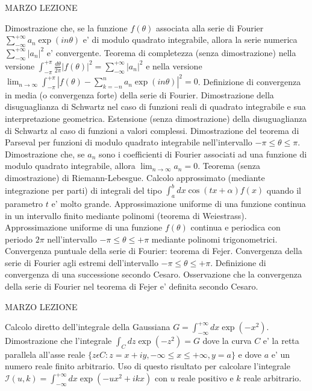 \documentclass[,12pt]{article}
\begin{document}
\vskip 20pt
 MARZO
\hskip 20pt
LEZIONE

\noindent
Dimostrazione che, se la funzione $f(\theta)$ associata alla serie di
Fourier \linebreak $\sum_{-\infty}^{+\infty}a_n\exp(in\theta)$ e' di
modulo quadrato integrabile, allora la serie numerica
$\sum_{-\infty}^{+\infty}|a_n|^2$ e' convergente. Teorema di
completezza (senza dimostrazione) nella versione
$\int_{-\pi}^{+\pi}
\frac{d\theta}{2\pi}|f(\theta)|^2=
\sum_{-\infty}^{+\infty}|a_n|^2$ e nella versione
$\lim_{n\to\infty}\int_{-\pi}^{+\pi}|f(\theta)-
\sum_{k=-n}^{n}a_n\exp(in\theta)|^2=0$. Definizione di convergenza in
media (o convergenza forte) della serie di Fourier. Dimostrazione della
disuguaglianza di Schwartz nel caso di funzioni reali di quadrato
integrabile e sua interpretazione geometrica. Estensione (senza
dimostrazione) della disuguaglianza di Schwartz al caso di funzioni a
valori complessi. Dimostrazione del teorema di Parseval per funzioni di
modulo quadrato integrabile nell'intervallo $-\pi\leq\theta\leq\pi$.
Dimostrazione che, se $a_n$ sono i coefficienti di Fourier associati ad
una funzione di modulo quadrato integrabile, allora
$\lim_{n\to\infty}a_n=0$. Teorema (senza dimostrazione) di
Riemann-Lebesgue. Calcolo approssimato (mediante integrazione per parti)
di integrali del tipo
$\int_a^bdx\cos(tx+\alpha)f(x)$ quando il parametro $t$ e' molto
grande. Approssimazione uniforme di una funzione continua in un
intervallo finito mediante polinomi (teorema di Weiestrass).
Approssimazione uniforme di una funzione $f(\theta)$ continua e periodica
con periodo $2\pi$ nell'intervallo $-\pi\leq \theta\leq+\pi$ mediante
polinomi trigonometrici. Convergenza puntuale della serie di Fourier:
teorema di Fejer. Convergenza della serie di Fourier agli estremi
dell'intervallo $-\pi\leq \theta\leq+\pi$. Definizione di
convergenza di una successione secondo Cesaro. Osservazione che la
convergenza della serie di Fourier nel teorema di Fejer e' definita
secondo Cesaro.   

\vskip 20pt
 MARZO
\hskip 20pt
LEZIONE

\noindent
Calcolo diretto dell'integrale della Gaussiana
$G=\int_{-\infty}^{+\infty}dx\exp(-x^2)$. Dimostrazione che l'integrale
$\int_C dz\exp(-z^2)=G$ dove la curva $C$ e' la retta parallela all'asse
reale $\{z\epsilon C: z=x+iy, -\infty \leq x\leq +\infty , y=a\}$ e dove
$a$ e' un numero reale finito arbitrario. Uso di questo risultato per
calcolare l'integrale
$\mathcal{I}(u,k)=\int_{-\infty}^{+\infty}dx\exp(-ux^2+ikx)$ con $u$
reale positivo e $k$ reale arbitrario.
\end{document}
